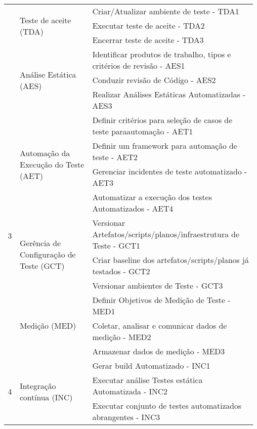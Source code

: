 \begin{table}[H]
{\begin{tabular}{|p{45mm}|p{76mm}|p{100mm}|}
    \cline{2-3}
        & \multirow{3}{*}{Teste de aceite (TDA)}& 
        Criar/Atualizar ambiente de teste - TDA1\\ 
    \cline{3-3}
        & & Executar teste de aceite - TDA2\\ 
    \cline{3-3}
        & & Encerrar teste de aceite - TDA3\\ 
    \cline{2-3}
        & \multirow{3}{*}{Análise Estática (AES)}& 
        Identificar produtos de trabalho, tipos e critérios de revisão - AES1\\ 
    \cline{3-3}
        & & Conduzir revisão de Código - AES2\\ 
    \cline{3-3}
        & & Realizar Análises Estáticas Automatizadas - AES3\\
    \hline
        \multirow{10}{*}{3}&
       \multirow{4}{*}{Automação da Execução do Teste (AET)}& Definir critérios para seleção de casos de teste paraautomação - AET1\\ 
    \cline{3-3}
        & & Definir um framework para automação de teste - AET2\\
    \cline{3-3}
        &  & Gerenciar incidentes de teste automatizado - AET3\\
    \cline{3-3}
        & & Automatizar a execução dos testes Automatizados - AET4\\ 
    \cline{2-3}
        & \multirow{3}{*}{Gerência de Configuração de Teste (GCT)} & 
        Versionar Artefatos/scripts/planos/infraestrutura de Teste - GCT1\\ 
    \cline{3-3}
        & & Criar baseline dos artefatos/scripts/planos já testados - GCT2\\
    \cline{3-3}
        & & Versionar ambientes de Teste - GCT3\\ 
    \cline{2-3}
        & \multirow{3}{*}{Medição (MED)}& 
        Definir Objetivos de Medição de Teste - MED1\\ 
    \cline{3-3}
        & & Coletar, analisar e comunicar dados de medição - MED2\\
    \cline{3-3}
        & & Armazenar dados de medição - MED3\\ 
    \hline
        \multirow{12}{*}{4}& 
        \multirow{4}{*}{Integração contínua (INC)}& 
        Gerar build Automatizado - INC1\\ 
    \cline{3-3} 
        & & Executar análise Testes estática Automatizada - INC2\\ 
    \cline{3-3}
        & & Executar conjunto de testes automatizados abrangentes - INC3\\ 

\end{tabular}}
\end{table}
